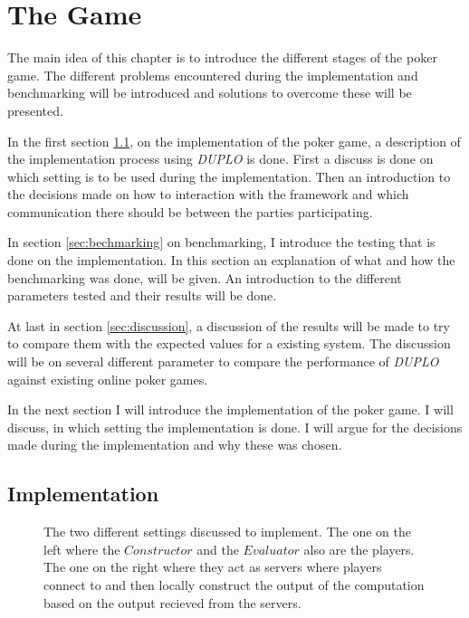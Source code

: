 \documentclass[twoside,11pt,openright]{report}
\newcommand{\DUPLO}{\textit{DUPLO} }
\begin{document}
\chapter{The Game}
\label{ch:implementation}
The main idea of this chapter is to introduce the different stages of the poker game. The different problems encountered during the implementation and benchmarking will be introduced and solutions to overcome these will be presented.

In the first section \ref{sec:poker_imp}, on the implementation of the poker game, a description of the implementation process using \DUPLO is done. First a discuss is done on which setting is to be used during the implementation. Then an introduction to the decisions made on how to interaction with the framework and which communication there should be between the parties participating.

In section \ref{sec:bechmarking} on benchmarking, I introduce the testing that is done on the implementation. In this section an explanation of what and how the benchmarking was done, will be given. An introduction to the different parameters tested and their results will be done.

At last in section \ref{sec:discussion}, a discussion of the results will be made to try to compare them with the expected values for a existing system. The discussion will be on several different parameter to compare the performance of \DUPLO against existing online poker games.

\bigskip

In the next section I will introduce the implementation of the poker game. I will discuss, in which setting the implementation is done. I will argue for the decisions made during the implementation and why these was chosen. 

\section{Implementation}
\label{sec:poker_imp}

\begin{figure}[t]
\centering

\caption{The two different settings discussed to implement. The one on the left where the $Constructor$ and the $Evaluator$ also are the players. The one on the right where they act as servers where players connect to and then locally construct the output of the computation based on the output recieved from the servers.}
\label{fig:poker_setting}
\end{figure}
\end{document}
